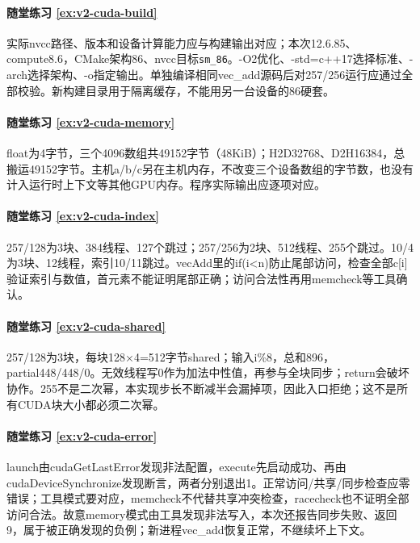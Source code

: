 \paragraph*{随堂练习 \ref{ex:v2-cuda-build}}
\begin{solution}
实际nvcc路径、版本和设备计算能力应与构建输出对应；本次12.6.85、compute8.6，CMake架构86、nvcc目标\texttt{sm\_86}。-O2优化、-std=c++17选择标准、-arch选择架构、-o指定输出。单独编译相同vec\_add源码后对257/256运行应通过全部校验。新构建目录用于隔离缓存，不能用另一台设备的86硬套。
\end{solution}

\paragraph*{随堂练习 \ref{ex:v2-cuda-memory}}
\begin{solution}
float为4字节，三个4096数组共49152字节（48KiB）；H2D32768、D2H16384，总搬运49152字节。主机a/b/c另在主机内存，不改变三个设备数组的字节数，也没有计入运行时上下文等其他GPU内存。程序实际输出应逐项对应。
\end{solution}

\paragraph*{随堂练习 \ref{ex:v2-cuda-index}}
\begin{solution}
257/128为3块、384线程、127个跳过；257/256为2块、512线程、255个跳过。10/4为3块、12线程，索引10/11跳过。vecAdd里的if(i<n)防止尾部访问，检查全部c[i]验证索引与数值，首元素不能证明尾部正确；访问合法性再用memcheck等工具确认。
\end{solution}

\paragraph*{随堂练习 \ref{ex:v2-cuda-shared}}
\begin{solution}
257/128为3块，每块128×4=512字节shared；输入i\%8，总和896，partial448/448/0。无效线程写0作为加法中性值，再参与全块同步；return会破坏协作。255不是二次幂，本实现步长不断减半会漏掉项，因此入口拒绝；这不是所有CUDA块大小都必须二次幂。
\end{solution}

\paragraph*{随堂练习 \ref{ex:v2-cuda-error}}
\begin{solution}
launch由cudaGetLastError发现非法配置，execute先启动成功、再由cudaDeviceSynchronize发现断言，两者分别退出1。正常访问/共享/同步检查应零错误；工具模式要对应，memcheck不代替共享冲突检查，racecheck也不证明全部访问合法。故意memory模式由工具发现非法写入，本次还报告同步失败、返回9，属于被正确发现的负例；新进程vec\_add恢复正常，不继续坏上下文。
\end{solution}

